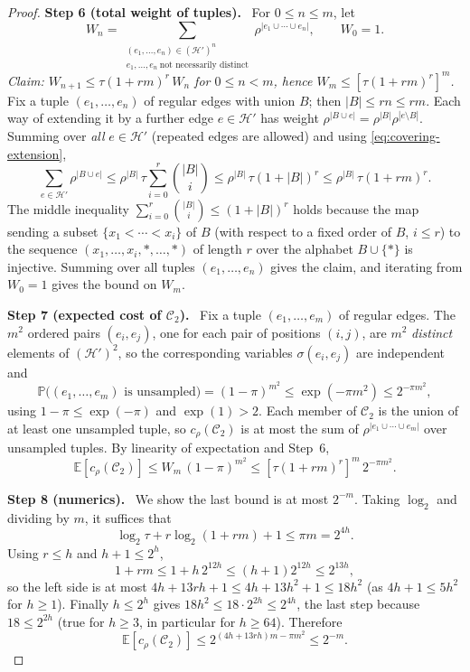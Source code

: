 \documentclass[11pt,letterpaper]{article}
\theoremstyle{definition}
\theoremstyle{remark}
\numberwithin{equation}{section}
\newcommand{\step}[1]{\par\medskip\noindent\textbf{#1}\ }
\begin{document}
\begin{proof}
\step{Step 6 (total weight of tuples).}
For \(0\le n\le m\), let
\[
W_n=
\sum_{\substack{(e_1,\ldots,e_n)\in(\mathcal H')^n\\
                e_1,\ldots,e_n\ \text{not necessarily distinct}}}
  \rho^{|e_1\cup\cdots\cup e_n|},
\qquad W_0=1.
\]
\emph{Claim: $W_{n+1}\le \tau(1+rm)^r\,W_n$ for $0\le n<m$, hence
$W_m\le[\tau(1+rm)^r]^m$.}
Fix a tuple $(e_1,\ldots,e_n)$ of regular edges with union $B$;
then $|B|\le rn\le rm$. Each way of extending it by a further edge
$e\in\mathcal H'$ has weight
$\rho^{|B\cup e|}=\rho^{|B|}\rho^{|e\setminus B|}$. Summing over
\emph{all} $e\in\mathcal H'$ (repeated edges are allowed) and using
\eqref{eq:covering-extension},
\[
\sum_{e\in\mathcal H'}\rho^{|B\cup e|}
\le\rho^{|B|}\,\tau\sum_{i=0}^r\binom{|B|}{i}
\le\rho^{|B|}\,\tau(1+|B|)^r
\le\rho^{|B|}\,\tau(1+rm)^r .
\]
The middle inequality $\sum_{i=0}^r\binom{|B|}{i}\le(1+|B|)^r$ holds
because the map sending a subset $\{x_1<\cdots<x_i\}$ of $B$ (with respect
to a fixed order of $B$, $i\le r$) to the sequence
$(x_1,\ldots,x_i,\ast,\ldots,\ast)$ of length $r$ over the alphabet
$B\cup\{\ast\}$ is injective. Summing over all tuples $(e_1,\ldots,e_n)$
gives the claim, and iterating from $W_0=1$ gives the bound on $W_m$.

\step{Step 7 (expected cost of $\mathcal C_2$).}
Fix a tuple $(e_1,\ldots,e_m)$ of regular edges. The $m^2$ ordered pairs $(e_i,e_j)$, one for each pair of positions $(i,j)$, are $m^2$
\emph{distinct} elements of $(\mathcal H')^2$, so the corresponding
variables $\sigma(e_i,e_j)$ are independent and
\[
\mathbb P\bigl((e_1,\ldots,e_m)\text{ is unsampled}\bigr)
=(1-\pi)^{m^2}\le\exp(-\pi m^2)\le2^{-\pi m^2},
\]
using $1-\pi\le\exp(-\pi)$ and $\exp(1)>2$. Each member of $\mathcal C_2$
is the union of at least one unsampled tuple, so $c_\rho(\mathcal C_2)$ is
at most the sum of $\rho^{|e_1\cup\cdots\cup e_m|}$ over unsampled tuples.
By linearity of expectation and Step~6,
\[
\mathbb E[c_\rho(\mathcal C_2)]
\le W_m\,(1-\pi)^{m^2}
\le[\tau(1+rm)^r]^m\,2^{-\pi m^2}.
\]

\step{Step 8 (numerics).}
We show the last bound is at most $2^{-m}$. Taking $\log_2$ and dividing by
$m$, it suffices that
\[
\log_2 \tau+r\log_2(1+rm)+1\le\pi m=2^{4h}.
\]
Using $r\le h$ and $h+1\le2^h$,
\[
1+rm\le1+h\,2^{12h}\le(h+1)2^{12h}\le2^{13h},
\]
so the left side is at most $4h+13rh+1\le4h+13h^2+1\le18h^2$ (as
$4h+1\le5h^2$ for $h\ge1$). Finally $h\le 2^h$ gives
$18h^2\le18\cdot2^{2h}\le2^{4h}$, the last step because $18\le2^{2h}$
(true for $h\ge3$, in particular for $h\ge64$). Therefore
\begin{equation}\label{eq:covering-residual-cost}
\mathbb E[c_\rho(\mathcal C_2)]
\le2^{(4h+13rh)m-\pi m^2}\le2^{-m}.
\end{equation}


\end{proof}
\end{document}

